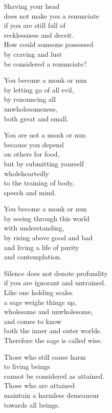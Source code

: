 Shaving your head\\
does not make you a renunciate\\
if you are still full of\\
recklessness and deceit.\\
How could someone possessed\\
by craving and lust\\
be considered a renunciate?


You become a monk or nun\\
by letting go of all evil,\\
by renouncing all\\
unwholesomeness,\\
both great and small.


You are not a monk or nun\\
because you depend\\
on others for food,\\
but by submitting yourself\\
wholeheartedly\\
to the training of body,\\
speech and mind.


You become a monk or nun\\
by seeing through this world\\
with understanding,\\
by rising above good and bad\\
and living a life of purity\\
and contemplation.


Silence does not denote profundity\\
if you are ignorant and untrained.\\
Like one holding scales\\
a sage weighs things up,\\
wholesome and unwholesome,\\
and comes to know\\
both the inner and outer worlds.\\
Therefore the sage is called wise.


Those who still cause harm\\
to living beings\\
cannot be considered as attained.\\
Those who are attained\\
maintain a harmless demeanour\\
towards all beings.


